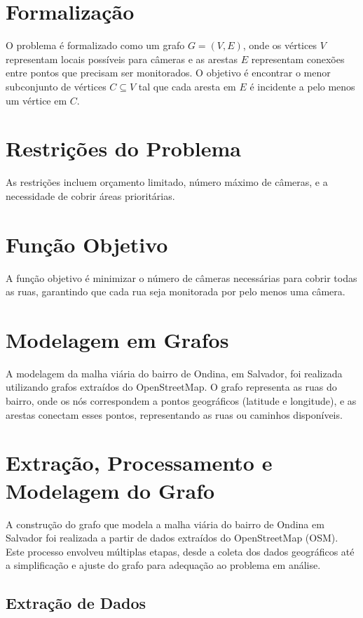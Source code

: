 \documentclass[12pt, a4paper]{report}
\begin{document}
\section{Formalização}
O problema é formalizado como um grafo \(G = (V, E)\), onde os vértices \(V\) representam locais possíveis para câmeras e as arestas \(E\) representam conexões entre pontos que precisam ser monitorados. O objetivo é encontrar o menor subconjunto de vértices \(C \subseteq V\) tal que cada aresta em \(E\) é incidente a pelo menos um vértice em \(C\).

\section{Restrições do Problema}
As restrições incluem orçamento limitado, número máximo de câmeras, e a necessidade de cobrir áreas prioritárias.

\section{Função Objetivo}
A função objetivo é minimizar o número de câmeras necessárias para cobrir todas as ruas, garantindo que cada rua seja monitorada por pelo menos uma câmera.

\section{Modelagem em Grafos}

A modelagem da malha viária do bairro de Ondina, em Salvador, foi realizada utilizando grafos extraídos do OpenStreetMap. O grafo representa as ruas do bairro, onde os nós correspondem a pontos geográficos (latitude e longitude), e as arestas conectam esses pontos, representando as ruas ou caminhos disponíveis.

\section{Extração, Processamento e Modelagem do Grafo}

A construção do grafo que modela a malha viária do bairro de Ondina em Salvador foi realizada a partir de dados extraídos do OpenStreetMap (OSM). Este processo envolveu múltiplas etapas, desde a coleta dos dados geográficos até a simplificação e ajuste do grafo para adequação ao problema em análise.

\subsection{Extração de Dados}
\end{document}
